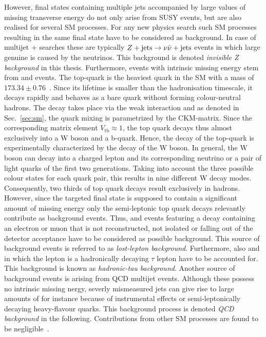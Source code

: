 However, final states containing multiple jets accompanied by large values of missing transverse energy do not only arise from SUSY events, but are also realised for several SM processes. For any new physics search such SM processes resulting in the same final state have to be considered as background. In case of multijet + \met searches these are typically $Z+\text{jets} \rightarrow \nu \bar{\nu} + \mathrm{jets}$ events in which large genuine \met is caused by the neutrinos. This background is denoted \textit{invisible Z background} in this thesis. Furthermore, events with intrinsic missing energy stem from \WJets and \ttbar events. The top-quark is the heaviest quark in the SM with a mass of $173.34 \pm 0.76$\gev~\cite{ATLAS:2014wva}. Since its lifetime is smaller than the hadronisation timescale, it decays rapidly and behaves as a bare quark without forming colour-neutral hadrons. The decay takes place via the weak interaction and as denoted in Sec.~\ref{sec:sm}, the quark mixing is parametrized by the CKM-matrix. Since the corresponding matrix element $V_{\mathrm{tb}} \approx 1$, the top quark decays thus almost exclusively into a W boson and a b-quark. Hence, the decay of the top-quark is experimentally characterized by the decay of the W boson. In general, the W boson can decay into a charged lepton and its corresponding neutrino or a pair of light quarks of the first two generations. Taking into account the three possible colour states for each quark pair, this results in nine different W decay modes. Consequently, two thirds of top quark decays result exclusively in hadrons. However, since the targeted final state is supposed to contain a significant amount of missing energy only the semi-leptonic top quark decays relevantly contribute as background events. Thus, \WJets and \ttbar events featuring a decay containing an electron or muon that is not reconstructed, not isolated or falling out of the detector acceptance have to be considered as possible background. This source of background events is referred to as \textit{lost-lepton background}. Furthermore, also \WJets and \ttbar in which the lepton is a hadronically decaying $\tau$ lepton have to be accounted for. This background is known as \textit{hadronic-tau background}. Another source of background events is arising from QCD multijet events. Although these possess no intrinsic missing nergy, severly mismeasured jets can give rise to large amounts of \met for instance because of instrumental effects or semi-leptonically decaying heavy-flavour quarks. This background process is denoted \textit{QCD background} in the following. Contributions from other SM processes are found to be negligible~\cite{springerlink:10.1007/JHEP08(2011)155, Chatrchyan:2012lia}. \\
